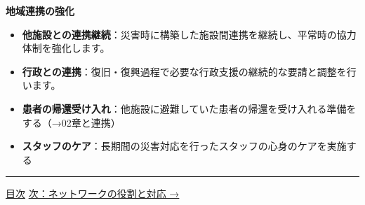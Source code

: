 \documentclass[
  japanese,
  letterpaper,
  DIV=11,
  numbers=noendperiod]{scrartcl}
\providecommand{\tightlist}{%
  \setlength{\itemsep}{0pt}\setlength{\parskip}{0pt}}
\begin{document}
\textbf{地域連携の強化}

\begin{itemize}
\tightlist
\item
  \textbf{他施設との連携継続}：災害時に構築した施設間連携を継続し、平常時の協力体制を強化します。
\item
  \textbf{行政との連携}：復旧・復興過程で必要な行政支援の継続的な要請と調整を行います。
\item
  \textbf{患者の帰還受け入れ}：他施設に避難していた患者の帰還を受け入れる準備をする（→02章と連携）
\item
  \textbf{スタッフのケア}：長期間の災害対応を行ったスタッフの心身のケアを実施する
\end{itemize}

\begin{center}\rule{0.5\linewidth}{0.5pt}\end{center}

\href{index.qmd}{目次} \textbar{}
\href{0200_福井県透析施設ネットワークの役割と対応.qmd}{次：ネットワークの役割と対応
→}
\end{document}
